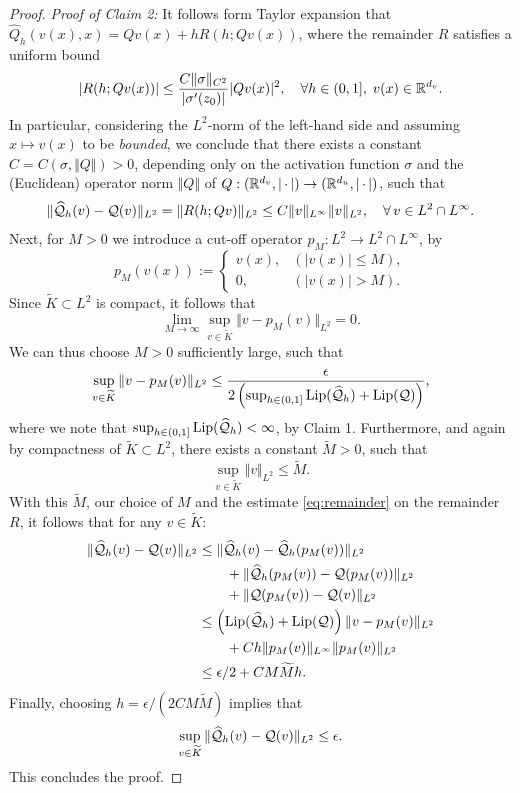 \documentclass[reqno,a4paper]{amsart}
\begin{document}
\begin{proof}
\emph{Proof of Claim 2:}
It follows form Taylor expansion that $\hat{Q}_h(v(x),x)=Qv(x) + h R(h;Qv(x))$, where the remainder $R$ satisfies a uniform bound
\[
|R(h;Qv(x))|\le \frac{C\Vert \sigma \Vert_{C^2}}{|\sigma'(z_0)|} |Qv(x)|^2,
\quad
\forall h\in (0,1], \; v(x) \in \mathbb{R}^{d_v}.
\]
In particular, considering the $L^2$-norm of the left-hand side and assuming $x\mapsto v(x)$ to be \emph{bounded}, we conclude that there exists a constant $C = C(\sigma, \Vert Q \Vert)>0$, depending only on the activation function $\sigma$ and the (Euclidean) operator norm $\Vert Q\Vert$ of $Q: (\mathbb{R}^{d_v},|{\,\cdot\,}|) \to (\mathbb{R}^{d_u},|{\,\cdot\,}|)$, such that 
\begin{align} \label{eq:remainder}
\Vert \widehat{\mathcal{Q}}_h(v) - \mathcal{Q}(v) \Vert_{L^2}
=
\Vert R(h;Qv) \Vert_{L^2} \le C \Vert v\Vert_{L^\infty} \Vert v \Vert_{L^2}, \quad \forall \, v \in L^2\cap L^\infty.
\end{align} 
Next, for $M>0$ we introduce a cut-off operator $p_M: L^2\to L^2\cap L^\infty$, by \[
p_M(v(x)) :=
\begin{cases}
v(x), & (|v(x)|\le M), \\
0, & (|v(x)| > M).
\end{cases}
\]
Since $\tilde{K}\subset L^2$ is compact, it follows that
\[
\lim_{M\to \infty} \sup_{v\in \tilde{K}} \Vert v - p_M(v) \Vert_{L^2} = 0.
\]
We can thus choose $M>0$ sufficiently large, such that 
\[
\sup_{v\in \widetilde{K}}
\Vert v - p_M(v) \Vert_{L^2}
\le
\frac{\epsilon}{2\left(
\sup_{h\in (0,1]} \mathrm{Lip}(\widehat{\mathcal{Q}}_h) + \mathrm{Lip}(\mathcal{Q})
\right)},
\]
where we note that $\sup_{h\in (0,1]} \mathrm{Lip}(\widehat{\mathcal{Q}}_h) <\infty$, by Claim 1.
Furthermore, and again by compactness of $\tilde{K}\subset L^2$, there exists a constant $\tilde{M} > 0$, such that 
\[
\sup_{v\in \tilde{K}} \Vert v \Vert_{L^2} \le \tilde{M}.
\]
With this $\tilde{M}$, our choice of $M$ and the estimate \eqref{eq:remainder} on the remainder $R$, it follows that for any $v\in \tilde{K}$:
\begin{align*}
\Vert \widehat{\mathcal{Q}}_h(v) - \mathcal{Q}(v) \Vert_{L^2}
&\le
\Vert \widehat{\mathcal{Q}}_h(v) - \widehat{\mathcal{Q}}_h(p_M(v)) \Vert_{L^2}
\\
&\qquad +\Vert \widehat{\mathcal{Q}}_h(p_M(v)) - \mathcal{Q}(p_M(v)) \Vert_{L^2}
\\
&\qquad
+\Vert \mathcal{Q}(p_M(v)) - \mathcal{Q}(v) \Vert_{L^2}
\\
&\le
\left(\mathrm{Lip}(\widehat{\mathcal{Q}}_h) + \mathrm{Lip}(\mathcal{Q})\right) \Vert v - p_M(v) \Vert_{L^2}
\\
&\qquad +
Ch\Vert p_M(v) \Vert_{L^\infty} \Vert p_M(v) \Vert_{L^2}
\\
&\le
\epsilon/2
+
CM \widetilde{M} h.
\end{align*}
Finally, choosing $h = \epsilon/(2CM\tilde{M})$ implies that
\[
\sup_{v\in \widetilde{K}}
\Vert \widehat{\mathcal{Q}}_h(v) - \mathcal{Q}(v) \Vert_{L^2}
\le \epsilon.
\]
This concludes the proof.

\end{proof}
\end{document}
